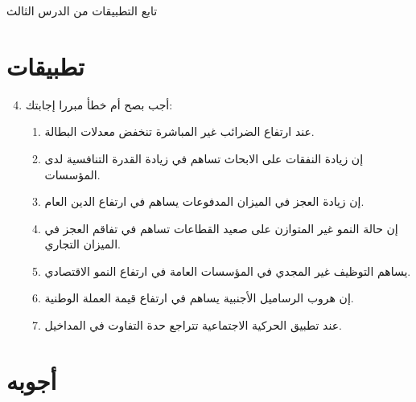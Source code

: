 \documentclass[a4paper]{article}
\begin{document}
\begin{center}
\huge{تابع التطبيقات من الدرس الثالث}
\end{center}

\section{تطبيقات}

\begin{enumerate}
    \setcounter{enumi}{3}
    \item أجب بصح أم خطأ مبررا إجابتك:
        \begin{enumerate}
            \item عند ارتفاع الضرائب غير المباشرة تنخفض معدلات البطالة.
            \item إن زيادة النفقات على الابحاث تساهم في زيادة القدرة التنافسية 
                لدى المؤسسات.
            \item إن زيادة العجز في الميزان المدفوعات يساهم في ارتفاع الدين
                العام.
            \item إن حالة النمو غير المتوازن على صعيد القطاعات تساهم في تفاقم
                العجز في الميزان التجاري.
            \item يساهم التوظيف غير المجدي في المؤسسات العامة في ارتفاع النمو
                الاقتصادي.
            \item إن هروب الرساميل الأجنبية يساهم في ارتفاع قيمة العملة الوطنية.
            \item عند تطبيق الحركية الاجتماعية تتراجع حدة التفاوت في المداخيل.
        \end{enumerate}
\end{enumerate}

\section{أجوبه}
\end{document}
